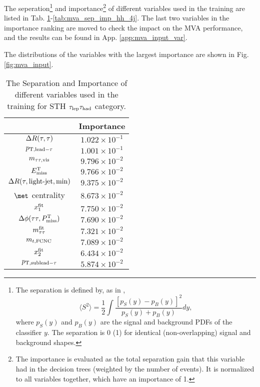 
The seperation\footnote{
The separation is defined by, as in \cite{BDT2},
\begin{equation}
\langle S^2 \rangle = \frac{1}{2} \int \frac{\left[p_S(y)-p_B(y)\right]^2}{p_S(y)+p_B(y)} dy,
\end{equation}
where $p_S(y)$ and $p_B(y)$ are the signal and background PDFs of the classifier $y$. The separation is 0 (1) for identical (non-overlapping) signal and background shapes.
} and importance\footnote{
The importance is evaluated as the total separation gain that this variable had in the decision trees (weighted by the number of events). It is normalized to all variables together, which have an importance of 1.
}
of different variables used in the training are listed in Tab. \ref{tab:mva_sep_imp_lh_3j}-\ref{tab:mva_sep_imp_hh_4j}. The last two variables in the importance ranking are moved to check the impact on the MVA performance, and the results can be found in App. \ref{app:mva_input_var}. 

The distributions of the variables with the largest importance are shown in Fig. \ref{fig:mva_input}.
\begin{table}
\caption{The Separation and Importance of different variables used in the training for STH $\tau_\text{lep}{}\tau_\text{had}$ category.}
\centering

\begin{tabular}{|c|c|} \hline
 & Importance \\ \hline

$\Delta R(\tau,\tau)      $ & $1.022\times10^{-1}$ \\
$p_{\text{T},\text{lead}-\tau}        $ & $1.001\times10^{-1}$ \\
$m_{\tau\tau,\text{vis}}     $ & $9.796\times10^{-2}$ \\
$E^{\text{T}}_{\text{miss}}        $ & $9.766\times10^{-2}$ \\
$\Delta R(\tau,\text{light-jet},\text{min})     $ & $9.375\times10^{-2}$ \\
$\met$ centrality & $8.673\times10^{-2}$ \\
$x_1^{\text{fit}}         $ & $7.750\times10^{-2}$ \\
$\Delta\phi(\tau\tau,P^{\text{T}}_{\text{miss}}) $ & $7.690\times10^{-2}$ \\
$m_{\tau\tau}^{\text{fit}}    $ & $7.321\times10^{-2}$ \\
$m_{t,\text{FCNC}}        $ & $7.089\times10^{-2}$ \\
$x_2^{\text{fit}}         $ & $6.434\times10^{-2}$ \\
$p_{\text{T},\text{sublead}-\tau}        $ & $5.874\times10^{-2}$ \\\hline

\end{tabular}
\label{tab:mva_sep_imp_lh_3j}
\end{table}

